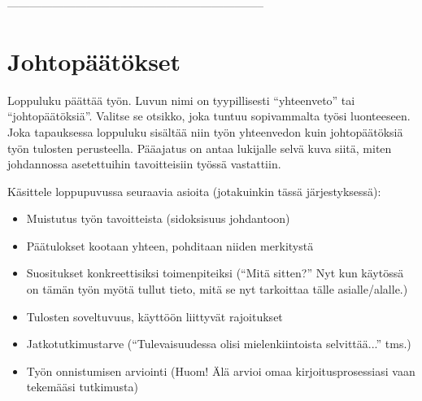  --------------------------------------------------------------------

\section{Johtopäätökset}

Loppuluku päättää työn. Luvun nimi on tyypillisesti ``yhteenveto'' tai
``johtopäätöksiä''. Valitse se otsikko, joka tuntuu sopivammalta työsi
luonteeseen. Joka tapauksessa loppuluku sisältää niin työn yhteenvedon
kuin johtopäätöksiä työn tulosten perusteella. Pääajatus on antaa
lukijalle selvä kuva siitä, miten johdannossa asetettuihin
tavoitteisiin työssä vastattiin.

Käsittele loppupuvussa seuraavia asioita (jotakuinkin tässä järjestyksessä):
%
\begin{itemize}
  \item Muistutus työn tavoitteista (sidoksisuus johdantoon)
  \item Päätulokset kootaan yhteen, pohditaan niiden merkitystä
  \item Suositukset konkreettisiksi toimenpiteiksi (``Mitä sitten?'' 
Nyt kun käytössä on tämän työn myötä tullut tieto, 
mitä se nyt tarkoittaa tälle asialle/alalle.)
  \item Tulosten soveltuvuus, käyttöön liittyvät rajoitukset
  \item Jatkotutkimustarve 
(``Tulevaisuudessa olisi mielenkiintoista selvittää...'' tms.)
  \item Työn onnistumisen arviointi 
(Huom! Älä arvioi omaa kirjoitusprosessiasi vaan tekemääsi tutkimusta)
\end{itemize}


